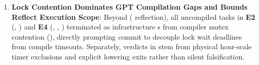 \begin{enumerate}
  \item \textbf{Lock Contention Dominates GPT Compilation Gaps and  Bounds Reflect Execution Scope}: Beyond  ( reflection), all uncompiled tasks in \textbf{E2} (, ) and \textbf{E4} (, , ) terminated as infrastructure s from compiler mutex contention (), directly prompting commit  to decouple lock wait deadlines from compile timeouts. Separately,  verdicts in  stem from physical hour-scale timer exclusions and explicit  lowering exits rather than silent falsification.
\end{enumerate}